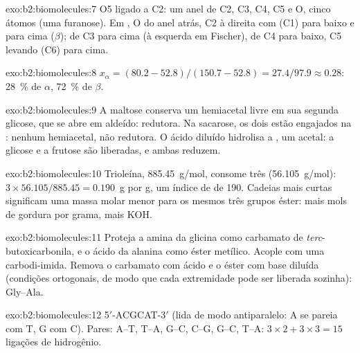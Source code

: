 \begin{solution}{exo:b2:biomolecules:7}
O5 ligado a C2: um anel de C2, C3, C4, C5 e O, cinco átomos (uma furanose). Em , O do
anel atrás, C2 à direita com  (C1) para baixo e  para cima ($\beta$);  de C3 para
cima (à esquerda em Fischer),  de C4 para baixo, C5 levando  (C6) para cima.
\end{solution}

\begin{solution}{exo:b2:biomolecules:8}
$x_\alpha = (80.2 - 52.8)/(150.7 - 52.8) = 27.4/97.9 \approx 0.28$: 28~\% de $\alpha$, 72~\% de $\beta$.
\end{solution}

\begin{solution}{exo:b2:biomolecules:9}
A maltose conserva um hemiacetal livre em sua segunda glicose, que se abre em aldeído: redutora. Na
sacarose, os dois  estão engajados na : nenhum hemiacetal, não
redutora. O ácido diluído hidrolisa a , um acetal: a glicose e a frutose são
liberadas, e ambas reduzem.
\end{solution}

\begin{solution}{exo:b2:biomolecules:10}
Trioleína, \qty{885.45}{g/mol}, consome três  (\qty{56.105}{g/mol}): $3 \times 56.105/885.45 =
0.190$~g por g, um índice de  de 190. Cadeias mais curtas significam uma massa molar menor
para os mesmos três grupos éster: mais mols de gordura por grama, mais KOH.
\end{solution}

\begin{solution}{exo:b2:biomolecules:11}
Proteja a amina da glicina como carbamato de \textit{terc}-butoxicarbonila, e o ácido da alanina como
éster metílico. Acople com uma carbodi-imida. Remova o carbamato com ácido e o éster com base diluída
(condições ortogonais, de modo que cada extremidade pode ser liberada sozinha): Gly--Ala.
\end{solution}

\begin{solution}{exo:b2:biomolecules:12}
5$'$-ACGCAT-3$'$ (lida de modo antiparalelo: A se pareia com T, G com C). Pares: A--T, T--A, G--C, C--G, G--C, T--A:
$3 \times 2 + 3 \times 3 = 15$ ligações de hidrogênio.
\end{solution}

